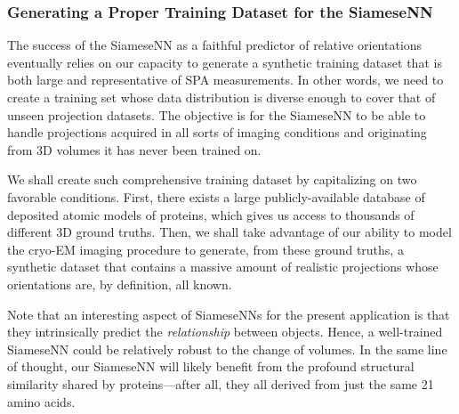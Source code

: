 \subsubsection{Generating a Proper Training Dataset for the SiameseNN}
\label{sec:training-siamese}

The success of the SiameseNN as a faithful predictor of relative orientations eventually relies on our capacity to generate a synthetic training dataset that is both large and representative of SPA measurements. In other words, we need to create a training set whose data distribution is diverse enough to cover that of unseen projection datasets. The objective is for the SiameseNN to be able to handle projections acquired in all sorts of imaging conditions and originating from 3D volumes it has never been trained on.

We shall create such comprehensive training dataset by capitalizing on two favorable conditions. First, there exists a large publicly-available database of deposited atomic models of proteins, which gives us access to thousands of different 3D ground truths. Then, we shall take advantage of our ability to model the cryo-EM imaging procedure to generate, from these ground truths, a synthetic dataset that contains a massive amount of realistic projections whose orientations are, by definition, all known.

Note that an interesting aspect of SiameseNNs for the present application is that they intrinsically predict the \textit{relationship} between objects. Hence, a well-trained SiameseNN could be relatively robust to the change of volumes. In the same line of thought, our SiameseNN will likely benefit from the profound structural similarity shared by proteins---after all, they all derived from just the same 21 amino acids.

